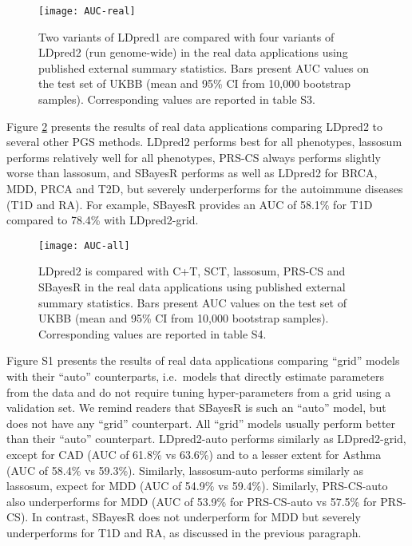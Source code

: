 \documentclass{bioinfo}
\begin{document}
\begin{figure}[htpb]
	\centering
	\texttt{[image: AUC-real]}
	\caption{Two variants of LDpred1 are compared with four variants of LDpred2 (run genome-wide) in the real data applications using published external summary statistics.
	Bars present AUC values on the test set of UKBB (mean and 95\% CI from 10,000 bootstrap samples).
	Corresponding values are reported in table S3. \label{fig:AUC-real}}
\end{figure}


Figure \ref{fig:AUC-all} presents the results of real data applications comparing LDpred2 to several other PGS methods.
LDpred2 performs best for all phenotypes, lassosum performs relatively well for all phenotypes, PRS-CS always performs slightly worse than lassosum, and SBayesR performs as well as LDpred2 for BRCA, MDD, PRCA and T2D, but severely underperforms for the autoimmune diseases (T1D and RA). For example, SBayesR provides an AUC of 58.1\% for T1D compared to 78.4\% with LDpred2-grid.

\begin{figure}[htbp]
	\centering
	\texttt{[image: AUC-all]}
	\caption{LDpred2 is compared with C+T, SCT, lassosum, PRS-CS and SBayesR in the real data applications using published external summary statistics.
	Bars present AUC values on the test set of UKBB (mean and 95\% CI from 10,000 bootstrap samples).
	Corresponding values are reported in table S4.
	}
	\label{fig:AUC-all}
\end{figure}

Figure S1 presents the results of real data applications comparing ``grid'' models with their ``auto'' counterparts, i.e.\ models that directly estimate parameters from the data and do not require tuning hyper-parameters from a grid using a validation set.
We remind readers that SBayesR is such an ``auto'' model, but does not have any ``grid'' counterpart.
All ``grid'' models usually perform better than their ``auto'' counterpart. 
LDpred2-auto performs similarly as LDpred2-grid, except for CAD (AUC of 61.8\% vs 63.6\%) and to a lesser extent for Asthma (AUC of 58.4\% vs 59.3\%). 
Similarly, lassosum-auto performs similarly as lassosum, expect for MDD (AUC of 54.9\% vs 59.4\%). 
Similarly, PRS-CS-auto also underperforms for MDD (AUC of 53.9\% for PRS-CS-auto vs 57.5\% for PRS-CS).
In contrast, SBayesR does not underperform for MDD but severely underperforms for T1D and RA, as discussed in the previous paragraph.
\end{document}
